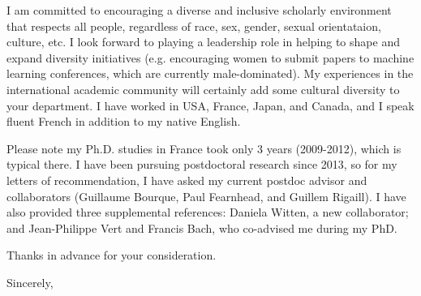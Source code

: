 \documentclass{article}
\begin{document}

I am committed to encouraging a diverse and inclusive scholarly
environment that respects all people, regardless of race, sex, gender,
sexual orientataion, culture, etc. I look forward to playing a
leadership role in helping to shape and expand diversity initiatives
(e.g. encouraging women to submit papers to machine learning
conferences, which are currently male-dominated). My experiences in
the international academic community will certainly add some cultural
diversity to your department. I have worked in USA, France, Japan, and
Canada, and I speak fluent French in addition to my native English.


Please note my Ph.D. studies in France took only 3
years (2009-2012), which is typical there.
I have been pursuing postdoctoral research since 2013, so for my
letters of recommendation, I have asked my current postdoc advisor and
collaborators (Guillaume Bourque, Paul Fearnhead, and Guillem
Rigaill). I have also provided three supplemental references: Daniela
Witten, a new collaborator; and Jean-Philippe Vert and Francis Bach,
who co-advised me during my PhD.

Thanks in advance for your consideration.

Sincerely,
\end{document}
